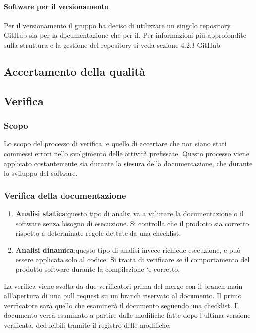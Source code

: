             \paragraph{Software per il versionamento}
            Per il versionamento il gruppo ha deciso di utilizzare un singolo repository GitHub sia per la documentazione che per il. Per informazioni
            più approfondite sulla struttura e la gestione del repository si veda sezione 4.2.3 GitHub

    \subsection{Accertamento della qualità}
    \subsection{Verifica}
        \subsubsection{Scopo}
        Lo scopo del processo di verifica `e quello di accertare che non siano stati commessi errori nello svolgimento
        delle attività prefissate. Questo processo viene applicato costantemente sia durante la stesura
        della documentazione, che durante lo sviluppo del software.
        \subsubsection{Verifica della documentazione}
        \begin{enumerate}
            \item   \textbf{Analisi statica}:questo tipo di analisi va a valutare la documentazione o il software senza bisogno
                                            di esecuzione. Si controlla che il prodotto sia corretto rispetto a determinate regole dettate da una checklist.
            \item   \textbf{Analisi dinamica}:questo tipo di analisi invece richiede esecuzione, e può essere
                                            applicata solo al codice. Si tratta di verificare se il comportamento del prodotto software durante
                                            la compilazione `e corretto.
        \end{enumerate}
        La verifica viene svolta da due verificatori prima del merge con il branch main all'apertura di
        una pull request su un branch riservato al documento. Il primo verificatore sarà quello che esaminerà il documento seguendo una checklist.
        Il documento verrà esaminato a partire dalle modifiche fatte dopo l'ultima versione verificata, deducibili
        tramite il registro delle modifiche.

